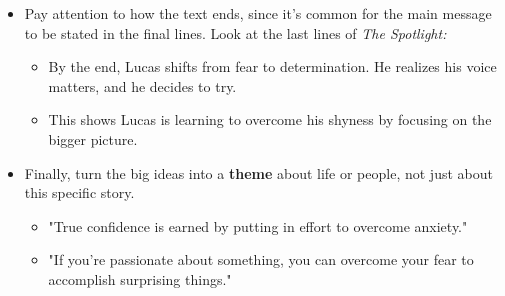 \documentclass[12pt]{article}
\begin{document}
\begin{tcolorbox}[colframe=black!60, colback=white, 
coltitle=black, colbacktitle=black!15, fonttitle=\bfseries\Large, 
title=Examples, halign title=center, left=10pt, right=10pt, top=10pt, bottom=15pt]
\begin{itemize}
 
   

    \item Pay attention to how the text ends, since it's common for the main message to be stated in the final lines. Look at the last lines of \textit{The Spotlight:}

        \begin{itemize}
            \item By the end, Lucas shifts from fear to determination. He realizes his voice matters, and he decides to try.
        \end{itemize}
        \begin{itemize}
            \item This shows Lucas is learning to overcome his shyness by focusing on the bigger picture.
        \end{itemize}

\item Finally, turn the big ideas into a \textbf{theme} about life or people, not just about this specific story. 

    \begin{itemize}
        \item "True confidence is earned by putting in effort to overcome anxiety."
    \end{itemize}
    \begin{itemize}
        \item "If you're passionate about something, you can overcome your fear to accomplish surprising things."
    \end{itemize}
\end{itemize}


\end{tcolorbox}
\end{document}
